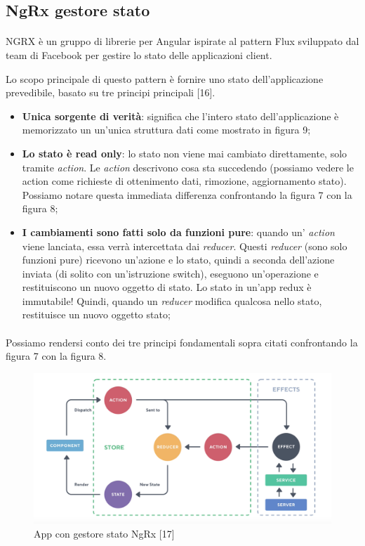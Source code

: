 \subsection{NgRx gestore stato}
\paragraph{}
NGRX è un gruppo di librerie per Angular ispirate al pattern Flux sviluppato dal team di Facebook per gestire
lo stato delle applicazioni client.

Lo scopo principale di questo pattern è fornire uno stato dell'applicazione prevedibile, basato su tre principi principali [16].

\begin{itemize}
    \item \textbf{Unica sorgente di verità}: significa che l'intero stato dell'applicazione è memorizzato un un'unica struttura dati come mostrato in figura 9;
    \item \textbf{Lo stato è read only}: lo stato non viene mai cambiato direttamente, 
    solo tramite \textit{action}. Le \textit{action} descrivono cosa sta succedendo (possiamo vedere le action
    come richieste di ottenimento dati, rimozione, aggiornamento stato). Possiamo notare questa immediata differenza confrontando la figura 7 con la figura 8;
    \item \textbf{I cambiamenti sono fatti solo da funzioni pure}: quando un' \textit{action} viene lanciata, essa verrà
    intercettata dai \textit{reducer}.
    Questi \textit{reducer} (sono solo funzioni pure) ricevono un'azione e lo stato, quindi a seconda dell'azione inviata 
    (di solito con un'istruzione switch), eseguono un'operazione e restituiscono un nuovo oggetto di stato. 
    Lo stato in un'app redux è immutabile! Quindi, quando un \textit{reducer} modifica qualcosa nello stato, 
    restituisce un nuovo oggetto stato;
\end{itemize}

\paragraph{}
Possiamo rendersi conto dei tre principi fondamentali sopra citati confrontando la figura 7 con la figura 8.

\begin{figure}[h!]
    \centering  
    \caption{App con gestore stato NgRx [17]}
    \includegraphics[scale=0.4]{img/cap2/ngrx}
\end{figure}
